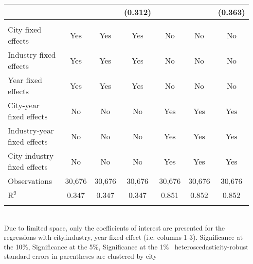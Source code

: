 \documentclass[12pt]{article}
\begin{document}
\begin{table}[!htbp]
\begin{adjustbox}{width=\textwidth, totalheight=\baselineskip,keepaspectratio}
\begin{tabular}{@{\extracolsep{5pt}}lcccccc}
  &  &  & (0.312) &  &  & (0.363) \\ 
 \hline \\[-1.8ex] 
City fixed effects & Yes & Yes & Yes & No & No & No \\ 
Industry fixed effects & Yes & Yes & Yes & No & No & No \\ 
Year fixed effects & Yes & Yes & Yes & No & No & No \\ 
City-year fixed effects & No & No & No & Yes & Yes & Yes \\ 
Industry-year fixed effects & No & No & No & Yes & Yes & Yes \\ 
City-industry fixed effects & No & No & No & Yes & Yes & Yes \\ 
Observations & 30,676 & 30,676 & 30,676 & 30,676 & 30,676 & 30,676 \\ 
R$^{2}$ & 0.347 & 0.347 & 0.347 & 0.851 & 0.852 & 0.852 \\ 
\hline 
\hline \\[-1.8ex] 
\end{tabular}
\end{adjustbox}
\begin{tablenotes} 
 \small 
 \item \\ 
\footnotesize{
Due to limited space, only the coefficients of interest are presented 
for the regressions with city,industry, year fixed effect (i.e. columns 1-3).
\sym{*} Significance at the 10\%, \sym{**} Significance at the 5\%, \sym{***} Significance at the 1\% \
heteroscedasticity-robust standard errors in parentheses are clustered by city 
}
 
\end{tablenotes}
\end{table}
\end{document}
